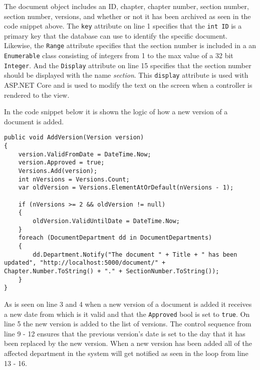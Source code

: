 The document object includes an ID, chapter, chapter number, section number, section number, versions, and whether or not it has been archived as seen in the code snippet above.
The \texttt{key} attribute on line 1 specifies that the \texttt{int ID} is a primary key that the database can use to identify the specific document.
Likewise, the \texttt{Range} attribute specifies that the section number is included in a an \texttt{Enumerable} class consisting of integers from 1 to the max value of a 32 bit \texttt{Integer}. %
And the \texttt{Display} attribute on line 15 specifies that the section number should be displayed with the name \textit{section}.
This \texttt{display} attribute is used with ASP.NET Core and is used to modify the text on the screen when a controller is rendered to the view.

In the code snippet below it is shown the logic of how a new version of a document is added.
\\

\begin{lstlisting}[caption={Document Model: AddVersion}, label={lst:addversion}]
public void AddVersion(Version version)
{
	version.ValidFromDate = DateTime.Now;
	version.Approved = true;
	Versions.Add(version);
	int nVersions = Versions.Count;
	var oldVersion = Versions.ElementAtOrDefault(nVersions - 1);

	if (nVersions >= 2 && oldVersion != null)
	{
		oldVersion.ValidUntilDate = DateTime.Now;
	}
	foreach (DocumentDepartment dd in DocumentDepartments)
	{
		dd.Department.Notify("The document " + Title + " has been updated", "http://localhost:5000/document/" + Chapter.Number.ToString() + "." + SectionNumber.ToString());
	}
}
\end{lstlisting}

As is seen on line 3 and 4 when a new version of a document is added it receives a new date from which is it valid and that the \texttt{Approved} bool is set to \texttt{true}.
On line 5 the new version is added to the list of versions.
The control sequence from line 9 - 12 ensures that the previous version's date is set to the day that it has been replaced by the new version.
When a new version has been added all of the affected department in the system will get notified as seen in the loop from line 13 - 16.

